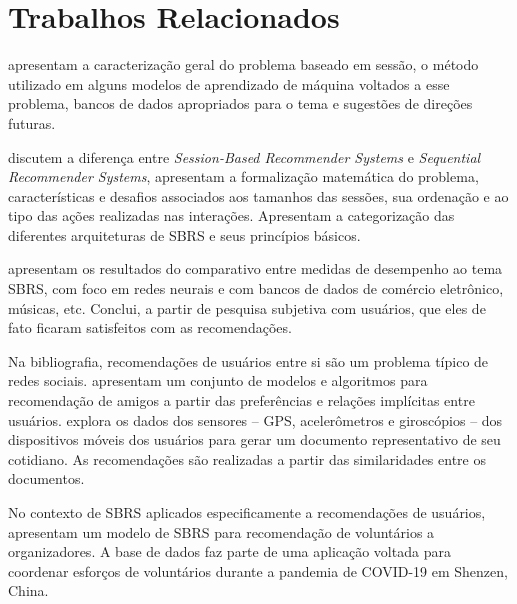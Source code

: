 \section{Trabalhos Relacionados}

\citet{rec_sys_handbook_2022} apresentam a caracterização geral do problema
baseado em sessão, o método utilizado em alguns modelos de aprendizado de
máquina voltados a esse problema, bancos de dados apropriados para o tema e
sugestões de direções futuras.

\citet{survey_wang_2021} discutem a diferença entre \textit{Session-Based Recommender Systems}
e \textit{Sequential Recommender Systems}, apresentam a formalização matemática
do problema, características e desafios associados aos tamanhos das sessões, sua
ordenação e ao tipo das ações realizadas nas interações. Apresentam a
categorização das diferentes arquiteturas de SBRS e seus princípios básicos.

\citet{ludewig2021empirical} apresentam os resultados do comparativo entre
medidas de desempenho ao tema SBRS, com foco em redes neurais e com bancos de
dados de comércio eletrônico, músicas, etc. Conclui, a partir de pesquisa subjetiva
com usuários, que eles de fato ficaram satisfeitos com as recomendações.



Na bibliografia, recomendações de usuários entre si são um problema típico de
redes sociais. \citet{cui2018dual} apresentam um conjunto de modelos e
algoritmos para recomendação de amigos a partir das preferências e relações
implícitas entre usuários. \citet{wang2014friendbook} explora os dados dos
sensores -- GPS, acelerômetros e giroscópios -- dos dispositivos móveis dos
usuários para gerar um documento representativo de seu cotidiano. As
recomendações são realizadas a partir das similaridades entre os documentos.

No contexto de SBRS aplicados especificamente a recomendações de usuários,
\citet{muvunza2023session} apresentam um modelo de SBRS para recomendação de
voluntários a organizadores. A base de dados faz parte de uma aplicação voltada
para coordenar esforços de voluntários durante a pandemia de COVID-19 em
Shenzen, China.



